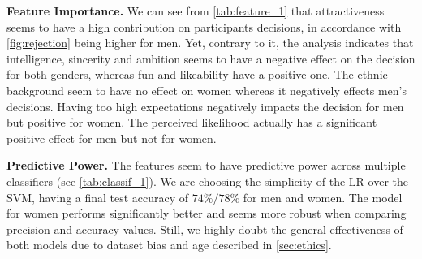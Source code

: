 \documentclass{article}
\begin{document}
\textbf{Feature Importance.} We can see from \autoref{tab:feature_1} that attractiveness seems to have a high contribution on participants decisions, in accordance with \autoref{fig:rejection} being higher for men. Yet, contrary to it, the analysis indicates that intelligence, sincerity and ambition seems to have a negative effect on the decision for both genders, whereas fun and likeability have a positive one. The ethnic background seem to have no effect on women whereas it negatively effects men's decisions. Having too high expectations negatively impacts the decision for men but positive for women. The perceived likelihood actually has a significant positive effect for men but not for women.  

\textbf{Predictive Power.} The features seem to have predictive power across multiple classifiers (see \autoref{tab:classif_1}). 
We are choosing the simplicity of the LR over the SVM, having a final test accuracy of $74\%/78\%$ for men and women. The model for women performs significantly better and seems more robust when comparing precision and accuracy values. 
Still, we highly doubt the general effectiveness of both models due to dataset bias and age described in \autoref{sec:ethics}.
\end{document}
